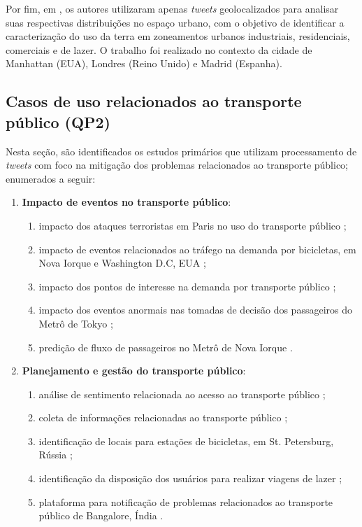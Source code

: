 \documentclass[
	12pt,				%
	oneside,			%
	a4paper,			%
	english,			%
	brazil				%
	]{abntex2ppgsi}
\begin{document}
{{{Por fim, em \cite{Frias-Martinez2014}, os autores utilizaram apenas \textit{tweets} geolocalizados para analisar suas respectivas distribuições no espaço urbano, com o objetivo de identificar a caracterização do uso da terra em zoneamentos urbanos industriais, residenciais, comerciais e de lazer. O trabalho foi realizado no contexto da cidade de Manhattan (EUA), Londres (Reino Unido) e Madrid (Espanha).

\subsection{Casos de uso relacionados ao transporte público (QP2)}
Nesta seção, são identificados os estudos primários que utilizam processamento de \textit{tweets} com foco na mitigação dos problemas relacionados ao transporte público; enumerados a seguir:
\begin{enumerate}
\item \textbf{Impacto de eventos no transporte público}:
\begin{enumerate}
\item impacto dos ataques terroristas em Paris no uso do transporte público \cite{Wen2016};
\item impacto de eventos relacionados ao tráfego na demanda por bicicletas, em Nova Iorque e Washington D.C, EUA \cite{Chen2016};
\item impacto dos pontos de interesse na demanda por transporte público \cite{Maghrebi2015};
\item impacto dos eventos anormais nas tomadas de decisão dos passageiros do Metrô de Tokyo \cite{Itoh2016};
\item predição de fluxo de passageiros no Metrô de Nova Iorque \cite{Ni2016}.
\end{enumerate}

\item \textbf{Planejamento e gestão do transporte público}:
\begin{enumerate}
\item análise de sentimento relacionada ao acesso ao transporte público \cite{Guo2016};
\item coleta de informações relacionadas ao transporte público \cite{Gal-Tzur2014};
\item identificação de locais para estações de bicicletas, em St. Petersburg, Rússia \cite{Gutev2016};
\item identificação da disposição dos usuários para realizar viagens de lazer \cite{Gkiotsalitis2016};
\item plataforma para notificação de problemas relacionados ao transporte público de Bangalore, Índia \cite{Mukherjee2015}.
\end{enumerate} 
\end{enumerate}

}}}
\end{document}
